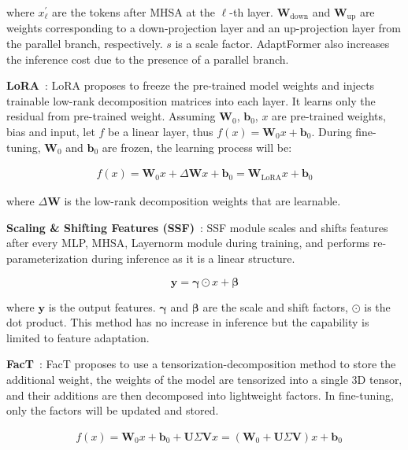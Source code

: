 where $x_{\ell}^{\prime}$ are the tokens after MHSA at the $\ell$-th layer. $\mathbf{W}_{\mathrm{down }}$ and $\mathbf{W}_{\mathrm{up}}$ are weights corresponding to a down-projection layer and an up-projection layer from the parallel branch, respectively. $s$ is a scale factor. AdaptFormer also increases the inference cost due to the presence of a parallel branch.

{\bf LoRA}~\citep{hu2021lora}: LoRA proposes to freeze the pre-trained model weights and injects trainable low-rank decomposition matrices into each layer. It learns only the residual from pre-trained weight. Assuming $\mathbf{W}_0$, $\mathbf{b}_0$, $x$ are pre-trained weights, bias and input, let $f$ be a linear layer, thus $f(x) = \mathbf{W}_0x+\mathbf{b}_0$. During fine-tuning, $\mathbf{W}_0$ and $\mathbf{b}_0$ are frozen, the learning process will be:

\begin{equation}
\begin{array}{ll} 
 f(x)=\mathbf{W}_{0} x+\Delta \mathbf{W} x+\mathbf{b}_{0}=\mathbf{W}_\mathrm{LoRA} x+\mathbf{b}_{0} 
\end{array}
\end{equation}

where $\Delta \mathbf{W}$ is the low-rank decomposition weights that are learnable.

{\bf Scaling \& Shifting Features (SSF)}~\citep{lian2022scaling}: SSF module scales and shifts features after every MLP, MHSA, Layernorm module during training, and performs re-parameterization during inference as it is a linear structure.

\begin{equation}
\bm y=\bm \gamma \odot x+\bm \beta
\end{equation}

where $\bm y$ is the output features. $\bm \gamma$ and $\bm \beta$ are the scale and shift factors, $\odot$ is the dot product. This method has no increase in inference but the capability is limited to feature adaptation. 

{\bf FacT}~\citep{jie2022fact}: FacT proposes to use a tensorization-decomposition method to store the additional weight, the weights of the model are tensorized into a single 3D tensor, and their additions are then decomposed into lightweight factors. In fine-tuning, only the factors will be updated and stored.

\begin{equation}
\begin{array}{ll} & f(x)=\mathbf{W}_{0} x+\mathbf{b}_{0}+\mathbf{U} \Sigma \mathbf{V} x=\left(\mathbf{W}_{0}+\mathbf{U} \Sigma \mathbf{V}\right) x+\mathbf{b}_{0} 
\end{array}
\end{equation}

